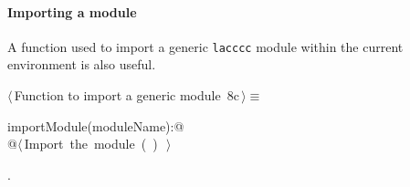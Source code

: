 \documentclass[11pt,oneside]{article}	%
\begin{document}
\paragraph{Importing a module} A function used to import a generic \texttt{lacccc} module within the current environment is also useful.
\begin{flushleft} \small
\begin{minipage}{\linewidth} \label{scrap16}
\protect{}$\langle\,$Function to import a generic module\nobreak\ {\footnotesize 8c}$\,\rangle\equiv$
\vspace{-1ex}
\begin{list}{}{} \item
\mbox{}\verb@def importModule(moduleName):@\\
\mbox{}\verb@   @\hbox{$\langle\,$Import the module\nobreak\ ({\footnotesize {}\label{scrap17}
 }\mbox{}\verb@moduleName@ ) {\footnotesize {}}$\,\rangle$}\verb@@\\
\mbox{}\verb@@{\NWsep}
\end{list}
\vspace{-1ex}
\footnotesize\addtolength{\baselineskip}{-1ex}
\begin{list}{}{\setlength{\itemsep}{-\parsep}\setlength{\itemindent}{-\leftmargin}}
\item {\NWtxtMacroNoRef}.
\end{list}
\end{minipage}\\[4ex]
\end{flushleft}




\end{document}
